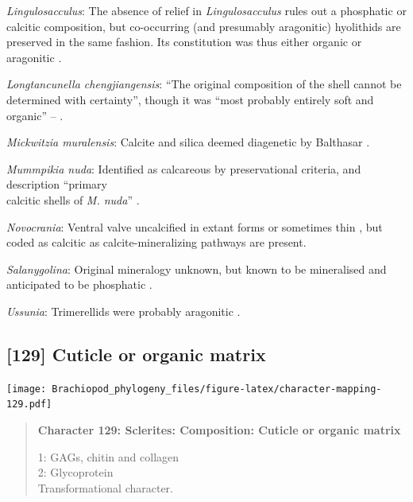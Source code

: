 \documentclass[openany]{book}
\begin{document}
\hypertarget{Lingulosacculus-coding-128}{}
\emph{Lingulosacculus}: The absence of relief in \emph{Lingulosacculus}
rules out a phosphatic or calcitic composition, but co-occurring (and
presumably aragonitic) hyolithids are preserved in the same fashion. Its
constitution was thus either organic or aragonitic
\citep{Balthasar2009EarlyCambrian}.

\hypertarget{Longtancunella_chengjiangensis-coding-128}{}
\emph{Longtancunella chengjiangensis}: ``The original composition of the
shell cannot be determined with certainty'', though it was ``most
probably entirely soft and organic'' --
\citet{Zhang2011Theexceptionally}.

\hypertarget{Mickwitzia_muralensis-coding-128}{}
\emph{Mickwitzia muralensis}: Calcite and silica deemed diagenetic by
Balthasar \citeyearpar{Balthasar2004Shellstructure}.

\hypertarget{Mummpikia_nuda-coding-128}{}
\emph{Mummpikia nuda}: Identified as calcareous by preservational
criteria, and description ``primary\\
calcitic shells of \emph{M. nuda}'' \citep{Balthasar2008iMummpikia}.

\hypertarget{Novocrania-coding-128}{}
\emph{Novocrania}: Ventral valve uncalcified in extant forms or
sometimes thin \citep{Williams2000LinguliformeaCraniiformea}, but coded
as calcitic as calcite-mineralizing pathways are present.

\hypertarget{Salanygolina-coding-128}{}
\emph{Salanygolina}: Original mineralogy unknown, but known to be
mineralised and anticipated to be phosphatic
\citep{Holmer2009Theenigmatic}.

\hypertarget{Ussunia-coding-128}{}
\emph{Ussunia}: Trimerellids were probably aragonitic
\citep{Williams2000LinguliformeaCraniiformea}.

\subsection*{{[}129{]} Cuticle or organic
matrix}\label{cuticle-or-organic-matrix}

\texttt{[image: Brachiopod\_phylogeny\_files/figure-latex/character-mapping-129.pdf]}

\begin{quote}
\textbf{Character 129: Sclerites: Composition: Cuticle or organic
matrix}

1: GAGs, chitin and collagen\\
2: Glycoprotein\\
Transformational character.
\end{quote}
\end{document}
